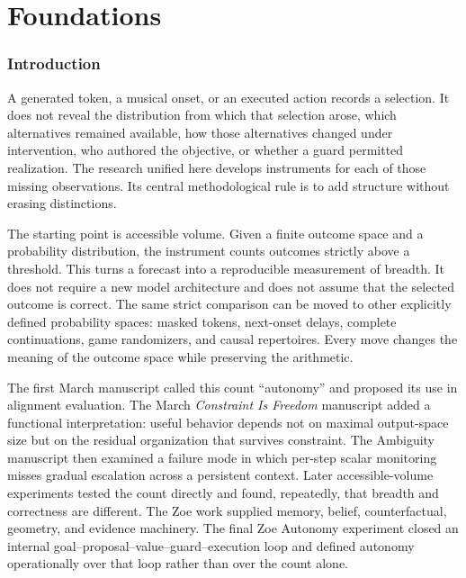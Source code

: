 \clearpage
\part{Foundations}

\section{Introduction}
A generated token, a musical onset, or an executed action records a selection. It does not reveal the distribution from which that selection arose, which alternatives remained available, how those alternatives changed under intervention, who authored the objective, or whether a guard permitted realization. The research unified here develops instruments for each of those missing observations. Its central methodological rule is to add structure without erasing distinctions.

The starting point is accessible volume. Given a finite outcome space and a probability distribution, the instrument counts outcomes strictly above a threshold. This turns a forecast into a reproducible measurement of breadth. It does not require a new model architecture and does not assume that the selected outcome is correct. The same strict comparison can be moved to other explicitly defined probability spaces: masked tokens, next-onset delays, complete continuations, game randomizers, and causal repertoires. Every move changes the meaning of the outcome space while preserving the arithmetic.

The first March manuscript called this count ``autonomy'' and proposed its use in alignment evaluation. The March \emph{Constraint Is Freedom} manuscript added a functional interpretation: useful behavior depends not on maximal output-space size but on the residual organization that survives constraint. The Ambiguity manuscript then examined a failure mode in which per-step scalar monitoring misses gradual escalation across a persistent context. Later accessible-volume experiments tested the count directly and found, repeatedly, that breadth and correctness are different. The Zoe work supplied memory, belief, counterfactual, geometry, and evidence machinery. The final Zoe Autonomy experiment closed an internal goal--proposal--value--guard--execution loop and defined autonomy operationally over that loop rather than over the count alone.

